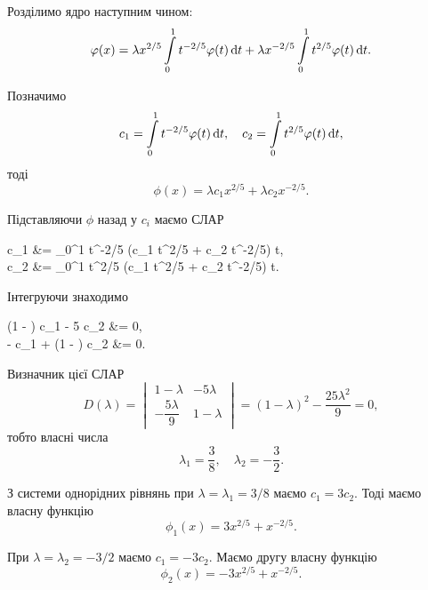 \begin{solution}
	Розділимо ядро наступним чином:
	\begin{equation*}
		\varphi(x) = \lambda x^{2 / 5} \displaystyle\int\limits_0^1 t^{-2/5} \varphi(t) \mathop{}\!\mathrm{d} t + \lambda x^{-2/5} \displaystyle\int\limits_0^1 t^{2/5} \varphi(t) \mathop{}\!\mathrm{d} t.
	\end{equation*}

	Позначимо
	\begin{equation*}
		c_1 = \displaystyle\int\limits_0^1 t^{-2/5} \varphi(t) \mathop{}\!\mathrm{d} t, \quad c_2 = \displaystyle\int\limits_0^1 t^{2/5} \varphi(t) \mathop{}\!\mathrm{d} t,
	\end{equation*}
	тоді
	\begin{equation*}
		\phi(x) = \lambda c_1 x^{2/5} + \lambda c_2 x^{-2/5}.
	\end{equation*}

	Підставляючи $\phi$ назад у $c_i$ маємо СЛАР
	\begin{system*}
		c_1 &= \Int_0^1 t^{-2/5} (\lambda c_1 t^{2/5} + \lambda c_2 t^{-2/5}) \diff t, \\
		c_2 &= \Int_0^1 t^{2/5} (\lambda c_1 t^{2/5} + \lambda c_2 t^{-2/5}) \diff t.
	\end{system*}

	Інтегруючи знаходимо
	\begin{system*}
		(1 - \lambda) c_1 - 5 \lambda c_2 &= 0, \\
		- c_1 + (1 - \lambda) c_2 &= 0.
	\end{system*}
	
	Визначник цієї СЛАР
	\begin{equation*}
		D(\lambda) = \begin{vmatrix} 1 - \lambda & - 5 \lambda \\ - \dfrac{5\lambda}{9} & 1 - \lambda \end{vmatrix} = (1 - \lambda)^2 - \dfrac{25\lambda^2}{9} = 0,
	\end{equation*}
	тобто власні числа
	\begin{equation*}
		\lambda_1 = \dfrac{3}{8}, \quad \lambda_2 = - \dfrac{3}{2}.
	\end{equation*}
	
	З системи однорідних рівнянь при $\lambda = \lambda_1 = 3 / 8$ маємо $c_1 = 3 c_2$. Тоді маємо власну функцію
	\begin{equation*}
		\phi_1(x) = 3 x^{2 / 5} + x^{-2 / 5}.
	\end{equation*}

	При $\lambda = \lambda_2 = - 3 / 2$ маємо $c_1 = - 3 c_2$. Маємо другу власну функцію
	\begin{equation*}
		\phi_2(x) = - 3 x^{2 / 5} + x^{-2 / 5}.
	\end{equation*}
\end{solution}

